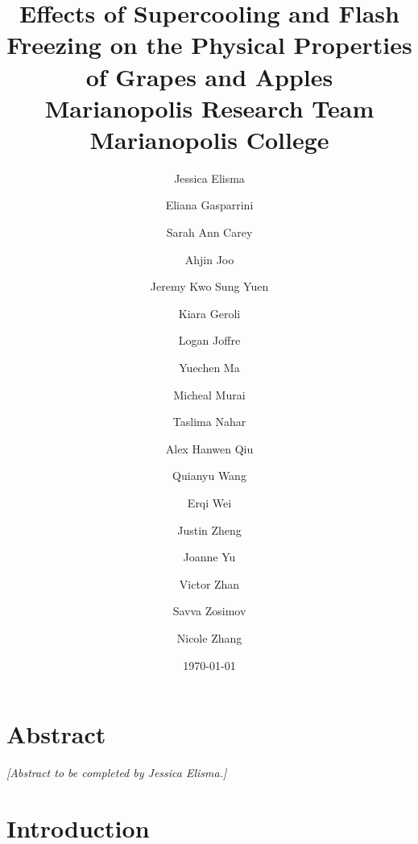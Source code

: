 \documentclass[12pt, a4paper]{article}
\title{\textbf{Effects of Supercooling and Flash Freezing on the Physical
Properties of Grapes and Apples}\\[1em]
\large Marianopolis Research Team\\
Marianopolis College}
\author{
  Jessica Elisma \and Eliana Gasparrini \and Sarah Ann Carey \and
  Ahjin Joo \and Jeremy Kwo Sung Yuen \and Kiara Geroli \and
  Logan Joffre \and Yuechen Ma \and Micheal Murai \and
  Taslima Nahar \and Alex Hanwen Qiu \and Quianyu Wang \and
  Erqi Wei \and Justin Zheng \and Joanne Yu \and
  Victor Zhan \and Savva Zosimov \and Nicole Zhang
}
\date{\today}
\begin{document}
\maketitle

\section*{Abstract}


\textit{[Abstract to be completed by Jessica Elisma.]}

\newpage

\section{Introduction}

\end{document}
